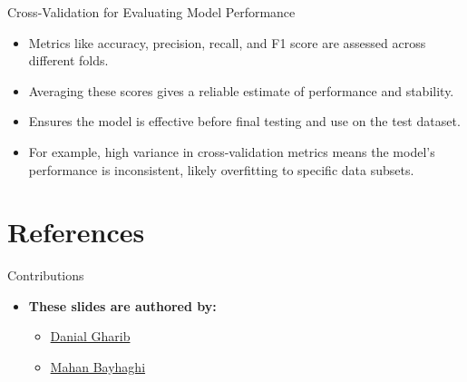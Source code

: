 \documentclass[serif, aspectratio=169]{beamer}
\begin{document}
\begin{frame}{Cross-Validation for Evaluating Model Performance}
    \begin{itemize}\itemsep1.2em
        \item Metrics like accuracy, precision, recall, and F1 score are assessed across different folds.
        \item Averaging these scores gives a reliable estimate of performance and stability.
        \item Ensures the model is effective before final testing and use on the test dataset.
        \item \justifying For example, high variance in cross-validation metrics means the model's performance is inconsistent, likely overfitting to specific data subsets.
    \end{itemize}
\end{frame}

\section{References}

\begin{frame}{Contributions}
\begin{itemize}
\item \textbf{These slides are authored by:}
\begin{itemize}
    \setlength{\itemsep}{10pt} %
    \item \href{https://github.com/Danial-Gharib}{Danial Gharib}
    \item \href{https://github.com/Mahan-Bayhaghi}{Mahan Bayhaghi}
\end{itemize}
\end{itemize}

\end{frame}

\begin{frame}[allowframebreaks]
    
    
    \nocite{*}
\end{frame}
\end{document}
